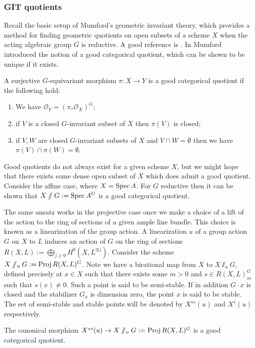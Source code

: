 \subsubsection{GIT quotients}
Recall the basic setup of Mumford's geometric invariant theory, which provides a method for finding geometric quotients on open subsets of a scheme \(X\) when the acting algebraic group \(G\) is reductive. A good reference is \cite{mumford1994}.
%
%
%
In \cite{mumford1994} Mumford introduced the notion of a good categorical quotient, which can be shown to be unique if it exists.
%
%
%
\begin{definition}
A surjective \(G\)-equivariant morphism \(\pi : X \to Y\) is a good categorical quotient if the following hold:
\begin{enumerate}
\item We have \(\mathcal{O}_Y = (\pi_* \mathcal{O}_X)^G\);
\item if \(V\) is a closed \(G\)-invariant subset of \(X\) then \(\pi(V)\) is closed;
\item if \(V,W\) are closed \(G\)-invariant subsets of \(X\) and \(V \cap W = \emptyset\) then we have \(\pi(V) \cap \pi(W) = \emptyset\).
\end{enumerate}
\end{definition}
%
%
%
Good quotients do not always exist for a given scheme \(X\), but we might hope that there exists some dense open subset of \(X\) which does admit a good quotient. Consider the affine case, where \(X = \operatorname{Spec} A\). For \(G\) reductive then it can be shown that \(X \sslash G : = \operatorname{Spec} A^G\) is a good categorical quotient.

The same ansatz works in the projective case once we make a choice of a lift of the action to the ring of sections of a given ample line bundle. This choice is known as a linearization of the group action.
%
%
%
%
%
%
A linearization \(u\) of a group action \(G\) on \(X\) to \(L\) induces an action of \(G\) on the ring of sections \(R(X,L) := \bigoplus_{j \ge 0} H^0(X,L^{\otimes j}) \). Consider the scheme \(X \sslash_u G := \operatorname{Proj} R(X,L)^G\). Note we have a birational map from \(X\) to \(X \sslash_u G\), defined precisely at \(x \in X\) such that there exists some \(m> 0 \) and \(s \in R(X,L)^G_m\) such that \(s(x) \neq 0\). Such a point is said to be semi-stable. If in addition \(G \cdot x\) is closed and the stabilizer \(G_x\) is dimension zero, the point \(x\) is said to be stable. The set of semi-stable and stable points will be denoted by \(X^{ss}(u)\) and \(X^{s}(u)\) respectively.
%
%
%
\begin{construction}
The canonical morphism \(X^{ss}(u) \to X\sslash_u G := \operatorname{Proj} R(X,L)^G \) is a good categorical quotient.
\end{construction}
